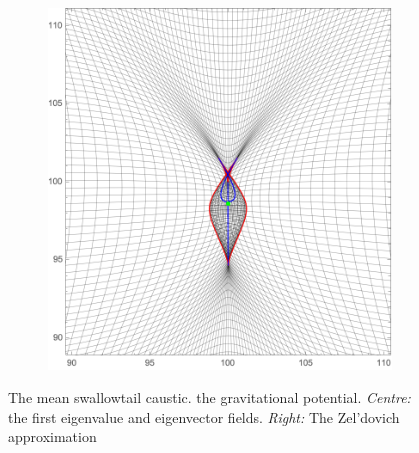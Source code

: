 \documentclass[a4paper, 11pt]{article}
\begin{document}
\begin{figure}
\begin{subfigure}[b]{0.32\textwidth}
\end{subfigure}~
\begin{subfigure}[b]{0.32\textwidth}
\includegraphics[width=\textwidth]{Swallowtail_mean_Z}
\end{subfigure}
\caption{The mean swallowtail caustic.  the gravitational potential. \textit{Centre:} the first eigenvalue and eigenvector fields. \textit{Right:} The Zel'dovich approximation}\label{fig:meanSwallowtail}
\end{figure}

\end{document}
